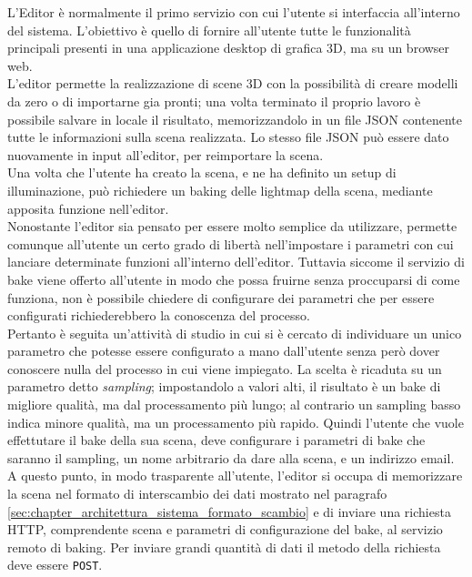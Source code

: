 L’Editor è normalmente il primo servizio con cui l’utente si interfaccia all’interno del sistema. L’obiettivo è quello di fornire all’utente tutte le funzionalità principali presenti in una applicazione desktop di grafica 3D, ma su un browser web.
\\
L’editor permette la realizzazione di scene 3D con la possibilità di creare modelli da zero o di importarne gia pronti; una volta terminato il proprio lavoro è possibile salvare in locale il risultato, memorizzandolo in un file JSON contenente tutte le informazioni sulla scena realizzata. Lo stesso file JSON può essere dato nuovamente in input all’editor, per reimportare la scena.
\\ 
Una volta che l’utente ha creato la scena, e ne ha definito un setup di illuminazione, può richiedere un baking delle lightmap della scena, mediante apposita funzione nell’editor.
\\
Nonostante l’editor sia pensato per essere molto semplice da utilizzare, permette comunque all’utente un certo grado di libertà nell’impostare i parametri con cui lanciare determinate funzioni all’interno dell’editor. Tuttavia siccome il servizio di bake viene offerto all’utente in modo che possa fruirne senza proccuparsi di come funziona, non è possibile chiedere di configurare dei parametri che per essere configurati richiederebbero la conoscenza del processo. 
\\
Pertanto è seguita un’attività di studio in cui si è cercato di individuare un unico parametro che potesse essere configurato a mano dall’utente senza però dover conoscere nulla del processo in cui viene impiegato. La scelta è ricaduta su un parametro detto \emph{sampling}; impostandolo a valori alti, il risultato è un bake di migliore qualità, ma dal processamento più lungo; al contrario un sampling basso indica minore qualità, ma un processamento più rapido. Quindi l’utente che vuole effettutare il bake della sua scena, deve configurare i parametri di bake che saranno il sampling, un nome arbitrario da dare alla scena, e un indirizzo email.
\\
A questo punto, in modo trasparente all’utente, l’editor si occupa di memorizzare la scena nel formato di interscambio dei dati mostrato nel paragrafo \ref{sec:chapter_architettura_sistema_formato_scambio} e di inviare una richiesta HTTP, comprendente scena e parametri di configurazione del bake, al servizio remoto di baking. Per inviare grandi quantità di dati il metodo della richiesta deve essere \texttt{POST}.
\\
